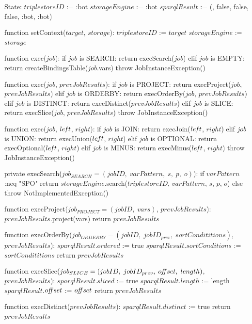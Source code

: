 State:
    $triplestoreID$ := :bot
    $storageEngine$ := :bot
    $sparqlResult$ := ({}, false, false, false, :bot, :bot)

function setContext($target$, $storage$):
    $triplestoreID$ := $target$
    $storageEngine$ := $storage$

function exec($job$):
    if $job$ is SEARCH:
        return execSearch($job$)
    elif $job$ is EMPTY:
        return createBindingsTable($job$.vars)
    throw JobInstanceException()

function exec($job$, $prevJobResults$):
    if $job$ is PROJECT:
        return execProject($job$, $prevJobResults$)
    elif $job$ is ORDERBY:
        return execOrderBy($job$, $prevJobResults$)
    elif $job$ is DISTINCT:
        return execDistinct($prevJobResults$)
    elif $job$ is SLICE:
        return execSlice($job$, $prevJobResults$)
    throw JobInstanceException()

function exec($job$, $le\textrm{\emph{f}}t$, $right$):
    if $job$ is JOIN:
        return execJoin($le\textrm{\emph{f}}t$, $right$)
    elif $job$ is UNION:
        return execUnion($le\textrm{\emph{f}}t$, $right$)
    elif $job$ is OPTIONAL:
        return execOptional($le\textrm{\emph{f}}t$, $right$)
    elif $job$ is MINUS:
        return execMinus($le\textrm{\emph{f}}t$, $right$)
    throw JobInstanceException()

private execSearch($job_{SEARCH} = (jobID, \; varPattern, \; s, \; p, \; o)$):
    if $varPattern$ :neq "SPO"
        return $storageEngine$.search($triplestoreID$, $varPattern$, $s$, $p$, $o$)
    else
        throw NotImplementedException()

function execProject($job_{PROJECT} = (jobID, \; vars)$, $prevJobResults$):
    $prevJobResults$.project(vars)
    return $prevJobResults$

function execOrderBy($job_{ORDERBY} = (jobID, \; jobID_{prev}, \; sortCondititions)$, $prevJobResults$):
    $sparqlResult$.$ordered$ := true
    $sparqlResult$.$sortConditions$ := $sortCondititions$
    return $prevJobResults$

function execSlice($job_{SLICE} = (jobID, \; jobID_{prev}, \; o\textrm{\emph{ff}}set, \; length)$, $prevJobResults$):
    $sparqlResult$.$sliced$ := true
    $sparqlResult$.$length$ := length
    $sparqlResult$.$o\textrm{\emph{ff}}set$ := $o\textrm{\emph{ff}}set$
    return $prevJobResults$

function execDistinct($prevJobResults$):
    $sparqlResult$.$distinct$ := true
    return $prevJobResults$

